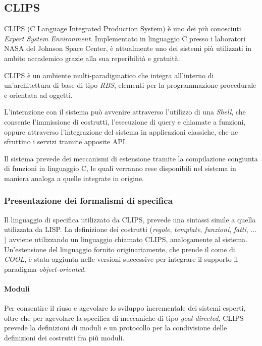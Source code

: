 \subsection{CLIPS}\label{par:clips}

CLIPS (C Language Integrated Production System) è uno dei più conosciuti \emph{Expert System Environment}. Implementato in linguaggio C presso i laboratori NASA del Johnson Space Center, è attualmente uno dei sistemi più utilizzati in ambito accademico grazie alla sua reperibilità e gratuità.

CLIPS è un ambiente multi-paradigmatico che integra all'interno di un'architettura di base di tipo \emph{RBS}, elementi per la programmazione procedurale e orientata ad oggetti.

L'interazione con il sistema può avvenire attraverso l'utilizzo di una \emph{Shell}, che consente l'immissione di costrutti, l'esecuzione di query e chiamate a funzioni, oppure attraverso l'integrazione del sistema in applicazioni classiche, che ne sfruttino i servizi tramite apposite API.

Il sistema prevede dei meccanismi di estensione tramite la compilazione congiunta di funzioni in linguaggio C, le quali verranno rese disponibili nel sistema in maniera analoga a quelle integrate in origine.

\subsubsection{Presentazione dei formalismi di specifica}\label{par:clips-formalism}

Il linguaggio di specifica utilizzato da CLIPS, prevede una sintassi simile a quella utilizzata da LISP. La definizione dei costrutti (\emph{regole}, \emph{template}, \emph{funzioni}, \emph{fatti}, $\dots$) avviene utilizzando un linguaggio chiamato CLIPS, analogamente al sistema. Un'estensione del linguaggio fornito originariamente, che prende il come di \emph{COOL}, è stata aggiunta nelle versioni successive per integrare il supporto il paradigma \emph{object-oriented}.

\paragraph{Moduli}
Per consentire il riuso e agevolare lo sviluppo incrementale dei sistemi esperti, oltre che per agevolare la specifica di meccaniche di tipo \emph{goal-directed}, CLIPS prevede la definizioni di moduli e un protocollo per la condivisione delle definizioni dei costrutti fra più moduli.

